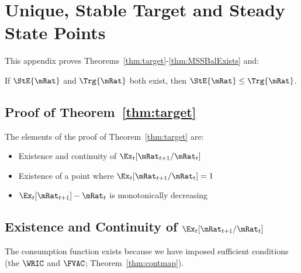 \documentclass[\econtexRoot/BufferStockTheory]{subfiles}
\begin{document}

\hypertarget{ApndxMTargetIsStable}{}
\section{Unique, Stable Target and Steady State Points}\label{sec:ApndxMTargetIsStable}


This appendix proves Theorems~\ref{thm:target}-\ref{thm:MSSBalExists} and:
\onlyinsubfile{\setcounter{theorem}{1}}

  \begin{lemma}\label{lemma:orderingPartOne}
  If $\StE{\mRat}$ and $\Trg{\mRat}$ both exist, then $\StE{\mRat} \leq \Trg{\mRat}$.
  \end{lemma}

  \begin{comment}
  \begin{lemma}\label{lemma:orderingPartTwo}
  If $\StE{\mRat}$ and $\Gro{\mRat}$ both exist, then $\StE{\mRat} \leq \Gro{\mRat}$.
  \end{lemma}
\end{comment}

  \subsection{Proof of Theorem~\ref{thm:target}}
  
  The elements of the proof of Theorem~\ref{thm:target} are:
\begin{itemize}
\item Existence and continuity of $\Ex_t [{\mRat}_{t+1}/\mRat_t]$
\item Existence of a point where $\Ex_t [{\mRat}_{t+1}/\mRat_t] = 1$
\item $\Ex_t [{\mRat}_{t+1}]-\mRat_{t}$ is monotonically decreasing
\end{itemize}


\subsection{Existence and Continuity of
  \texorpdfstring{$\Ex_t [{\mRat}_{t+1}/\mRat_t]$}{Ex-{t}[mRat-{t+1}/mRat-{t}]}}\label{subsubsec:RatExitsCont}
The consumption function exists because we have imposed sufficient conditions (the $\WRIC$ and $\FVAC$; Theorem~\ref{thm:contmap}). %
\end{document}
